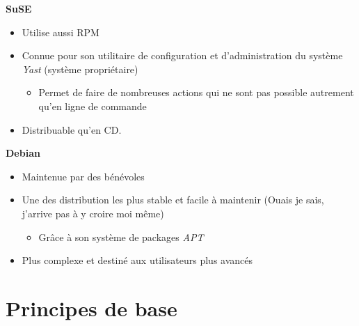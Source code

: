 \documentclass[a4paper]{article}
\begin{document}
  \textbf{SuSE}
  \begin{itemize}[label=\textbullet, font=\Large]
    \item Utilise aussi RPM
    \item Connue pour son utilitaire de configuration et d'administration du système \emph{Yast} (système propriétaire)
    \begin{itemize}[label=, font=\scriptsize]
      \item Permet de faire de nombreuses actions qui ne sont pas possible autrement qu'en ligne de commande
    \end{itemize}
    \item Distribuable qu'en CD.\\[0.2cm]
  \end{itemize}

  \textbf{Debian}
  \begin{itemize}[label=\textbullet, font=\Large]
    \item Maintenue par des bénévoles
    \item Une des distribution les plus stable et facile à maintenir (Ouais je sais, j'arrive pas à y croire moi même)
    \begin{itemize}[label=, font=\scriptsize]
      \item Grâce à son système de packages \emph{APT}
    \end{itemize}
    \item Plus complexe et destiné aux utilisateurs plus avancés\\[0.2cm]
  \end{itemize}

  \section{Principes de base}
\end{document}

